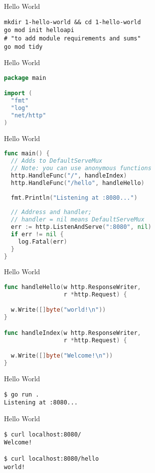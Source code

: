\documentclass{beamer}
\begin{document}
\begin{frame}[fragile]{Hello World}
\begin{lstlisting}
mkdir 1-hello-world && cd 1-hello-world
go mod init helloapi
# "to add module requirements and sums"
go mod tidy
\end{lstlisting}
\end{frame}

\begin{frame}[fragile]{Hello World}
\begin{lstlisting}[language=Go]
package main

import (
  "fmt"
  "log"
  "net/http"
)
\end{lstlisting}
\end{frame}

\begin{frame}[fragile]{Hello World}
\begin{lstlisting}[language=Go]
func main() {
  // Adds to DefaultServeMux
  // Note: you can use anonymous functions
  http.HandleFunc("/", handleIndex)
  http.HandleFunc("/hello", handleHello)
  
  fmt.Println("Listening at :8080...")
  
  // Address and handler;
  // handler = nil means DefaultServeMux
  err := http.ListenAndServe(":8080", nil)
  if err != nil {
    log.Fatal(err)
  }
}
\end{lstlisting}
\end{frame}

\begin{frame}[fragile]{Hello World}
\begin{lstlisting}[language=Go]
func handleHello(w http.ResponseWriter,
                 r *http.Request) {

  w.Write([]byte("world!\n"))
}

func handleIndex(w http.ResponseWriter,
                 r *http.Request) {

  w.Write([]byte("Welcome!\n"))
}
\end{lstlisting}
\end{frame}

\begin{frame}[fragile]{Hello World}
\begin{lstlisting}
$ go run .
Listening at :8080...
\end{lstlisting}
\end{frame}

\begin{frame}[fragile]{Hello World}
\begin{lstlisting}
$ curl localhost:8080/
Welcome!

$ curl localhost:8080/hello
world!
\end{lstlisting}
\end{frame}
\end{document}
